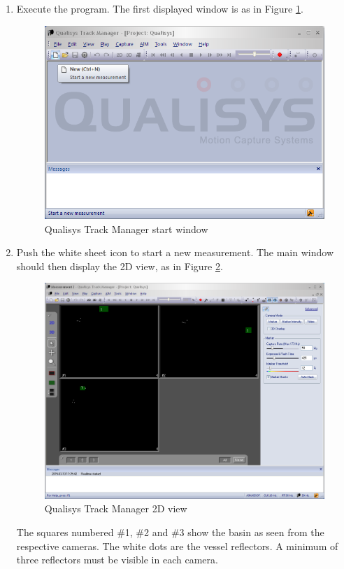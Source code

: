\documentclass[a4paper,english]{report}
\begin{document}
\begin{enumerate}
	\item Execute the program. The first displayed window is as in Figure \ref{fig: Qualisys Track Manager start window}.
		\begin{figure}[!h]
			\centering \includegraphics[width=1\textwidth]{fig/qualisys_new} 
			\caption{Qualisys Track Manager start window}
			\label{fig: Qualisys Track Manager start window}
		\end{figure}
	\item Push the white sheet icon to start a new measurement. The main window should then display the 2D view, as in Figure \ref{fig: Qualisys Track Manager 2D view}.
		\begin{figure}[!h]
			\centering 
			\includegraphics[width=1\textwidth]{fig/qualisys_3cams} 
			\caption{Qualisys Track Manager 2D view} 
			\label{fig: Qualisys Track Manager 2D view}
		\end{figure}
	The squares numbered \#1, \#2 and \#3 show the basin as seen from the respective cameras. The white dots are the vessel reflectors. A minimum of three reflectors must be visible in each camera. 
\end{enumerate}
\end{document}
